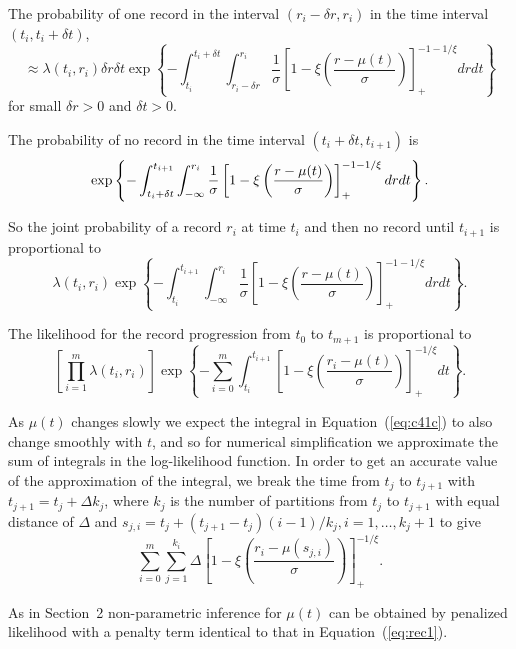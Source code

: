\documentclass[10pt]{article}
\begin{document}
The probability of one record in the interval $(r_i - \delta r,r_i)$
in the time interval \newline $(t_i,t_i + \delta t)$,
\[\approx \lambda(t_i,r_i)\delta r \delta t \exp \left\{-\int^{t_i
  + \delta t}_{t_i} \int^{r_i}_{r_i-\delta
        r}\frac{1}{\sigma}\left[1-\xi \left ( \frac{r - 
        \mu(t)}{\sigma}\right)\right]^{-1-1/\xi}_+ dr  dt \right\} \]
for small $\delta r > 0$ and $\delta t > 0$.


The probability of no record in the time interval $(t_i + \delta t,
t_{i+1})$ is
\[ \if 0 = \fi \exp \left\{ -\int^{t_{i + 1}}_{t_i + \delta t}
  \int^{r_i}_{-\infty}\frac{1}{\sigma}\left[1-\xi\left ( \frac{r -
        \mu(t)}{\sigma}\right)\right]^{-1-1/\xi}_+ dr dt  \right\}.\]

So the joint probability of a record $r_i$ at time $t_i$ and then no
record until $t_{i+1}$ is proportional to
\[ \lambda(t_i,r_i)\exp\left\{ - \int^{t_{i
    +1}}_{t_i}\int^{r_i}_{-\infty}\frac{1}{\sigma} \left[1-\xi\left ( \frac{r -
        \mu(t)}{\sigma}\right)\right]^{-1-1/\xi}_+ dr dt \right\}. \]

The likelihood for the record progression from $t_0$ to $t_{m+1}$ is
proportional to  
\begin{equation}
  \label{eq:c41c}
 \left [\prod^m_{i=1} \lambda(t_i,r_i) \right ]\exp \left \{-\sum^m_{i=0}
  \int^{t_{i+1}}_{t_i}
  \left [1-\xi\left(\frac{r_i 
-\mu(t)}{\sigma}\right) \right ]^{-1/\xi}_+ dt \right\}. 
\end{equation}

As $\mu(t)$ changes slowly we expect the integral in Equation~(\ref{eq:c41c}) to also
change smoothly with $t$, and so for numerical simplification we
approximate the sum of integrals in the log-likelihood function. 
In order to get an accurate value of the approximation of the integral, we
break the time from $t_j$ to $t_{j+1}$ with  $t_{j+1} = t_j +
\varDelta k_j$, where $k_j$ is the number of partitions from $t_j$ to
$t_{j+1}$ with equal distance of $\varDelta$ and
$s_{j,i}=t_j+(t_{j+1}-t_j)(i-1)/k_j,i=1,\ldots, k_j+1$
to give 
\begin{equation}   \sum^m_{i=0}
  \sum^{k_i}_{j=1}\varDelta \left [
    1-\xi\left ( \frac{r_i
-\mu(s_{j,i})}{\sigma}\right) \right]^{-1/\xi}_+ . 
\label{eq:jointfunction}
\end{equation}

As in Section~2 non-parametric inference for $\mu(t)$ can be obtained
by penalized likelihood with a penalty term identical to that in Equation~(\ref{eq:rec1}).
\end{document}
